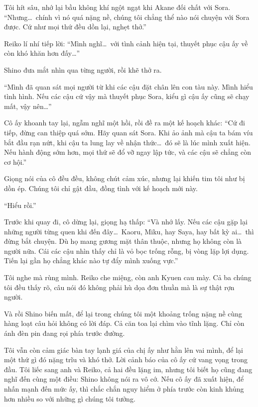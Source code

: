 \documentclass[../main.tex]{subfiles}
\begin{document}
Tôi hít sâu, nhớ lại bầu không khí ngột ngạt khi Akane đối chất với Sora. ``Nhưng\dots\ chính vì nó quá nặng nề, chúng tôi chẳng thể nào nói chuyện với Sora được. Cứ như mọi thứ đều dồn lại, nghẹt thở.''

Reiko lí nhí tiếp lời: ``Mình nghĩ\dots\ với tình cảnh hiện tại, thuyết phục cậu ấy về còn khó khăn hơn đấy\dots''

Shino đưa mắt nhìn qua từng người, rồi khẽ thở ra.

``Mình đã quan sát mọi người từ khi các cậu đặt chân lên con tàu này. Mình hiểu tình hình. Nếu các cậu cứ vậy mà thuyết phục Sora, kiểu gì cậu ấy cũng sẽ chạy mất, vậy nên\dots''

Cô ấy khoanh tay lại, ngẫm nghĩ một hồi, rồi đề ra một kế hoạch khác: ``Cứ đi tiếp, đừng can thiệp quá sớm. Hãy quan sát Sora. Khi ảo ảnh mà cậu ta bám víu bắt đầu rạn nứt, khi cậu ta lung lay về nhận thức\dots\ đó sẽ là lúc mình xuất hiện. Nếu hành động sớm hơn, mọi thứ sẽ đổ vỡ ngay lập tức, và các cậu sẽ chẳng còn cơ hội.''

Giọng nói của cô đều đều, không chút cảm xúc, nhưng lại khiến tim tôi như bị dồn ép. Chúng tôi chỉ gật đầu, đồng tình với kế hoạch mới này.

``Hiểu rồi.''

Trước khi quay đi, cô dừng lại, giọng hạ thấp: ``Và nhớ lấy. Nếu các cậu gặp lại những người từng quen khi đến đây\dots\ Kaoru, Miku, hay Saya, hay bất kỳ ai\dots\ thì đừng bắt chuyện. Dù họ mang gương mặt thân thuộc, nhưng họ không còn là người nữa. Cái các cậu nhìn thấy chỉ là vỏ bọc trống rỗng, bị vòng lặp lợi dụng. Tiến lại gần họ chẳng khác nào tự đẩy mình xuống vực.''

Tôi nghe mà rùng mình. Reiko che miệng, còn anh Kyuen cau mày. Cả ba chúng tôi đều thấy rõ, câu nói đó không phải hù dọa đơn thuần mà là sự thật rợn người.

Và rồi Shino biến mất, để lại trong chúng tôi một khoảng trống nặng nề cùng hàng loạt câu hỏi không có lời đáp. Cả căn toa lại chìm vào tĩnh lặng. Chỉ còn ánh đèn pin đang rọi phía trước đường.

Tôi vẫn còn cảm giác bàn tay lạnh giá của chị ấy như hằn lên vai mình, để lại một thứ gì đó nặng trĩu và khó thở. Lời cảnh báo của cô ấy cứ vang vọng trong đầu. Tôi liếc sang anh và Reiko, cả hai đều lặng im, nhưng tôi biết họ cũng đang nghĩ đến cùng một điều: Shino không nói ra vô cớ. Nếu cô ấy đã xuất hiện, để nhấn mạnh đến mức ấy, thì chắc chắn nguy hiểm ở phía trước còn kinh khủng hơn nhiều so với những gì chúng tôi tưởng.
\end{document}
